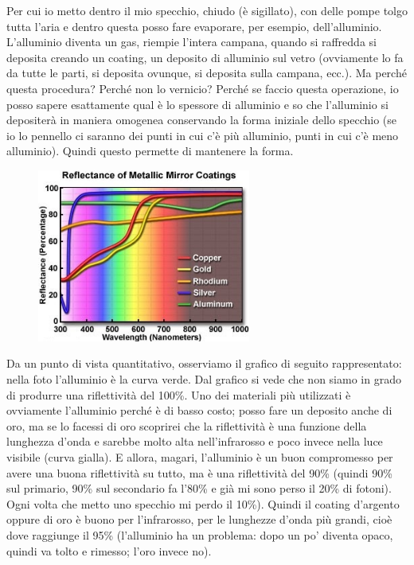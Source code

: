 \documentclass[a4paper,11pt]{article}
\begin{document}
Per cui io metto dentro il mio specchio, chiudo (è sigillato), con delle pompe tolgo tutta l’aria e dentro questa posso fare evaporare, per esempio, dell’alluminio. L’alluminio diventa un gas, riempie l’intera campana, quando si raffredda si deposita creando un coating, un deposito di alluminio sul vetro (ovviamente lo fa da tutte le parti, si deposita ovunque, si deposita sulla campana, ecc.). Ma perché questa procedura? Perché non lo vernicio? Perché se faccio questa operazione, io posso sapere esattamente qual è lo spessore di alluminio e so che l’alluminio si depositerà in maniera omogenea conservando la forma iniziale dello specchio (se io lo pennello ci saranno dei punti in cui c’è più alluminio, punti in cui c’è meno alluminio). Quindi questo permette di mantenere la forma.\\
\begin{figure}[h!!]
        \centering
        \includegraphics[width=7cm]{16.jpg}
        \label{}
    \end{figure}

Da un punto di vista quantitativo, osserviamo il grafico di seguito rappresentato: nella foto l’alluminio è la curva verde. Dal grafico si vede che non siamo in grado di produrre una riflettività del 100\%. Uno dei materiali più utilizzati è ovviamente l’alluminio perché è di basso costo; posso fare un deposito anche di oro, ma se lo facessi di oro scoprirei che la riflettività è una funzione della lunghezza d’onda e sarebbe molto alta nell’infrarosso e poco invece nella luce visibile (curva gialla). E allora, magari, l’alluminio è un buon compromesso per avere una buona riflettività su tutto, ma è una riflettività del 90\% (quindi 90\% sul primario, 90\% sul secondario fa l’80\% e già mi sono perso il 20\% di fotoni). Ogni volta che metto uno specchio mi perdo il 10\%). Quindi il coating d’argento oppure di oro è buono per l’infrarosso, per le lunghezze d’onda più grandi, cioè dove raggiunge il 95\% (l’alluminio ha un problema: dopo un po’ diventa opaco, quindi va tolto e rimesso; l’oro invece no).\\
\end{document}
